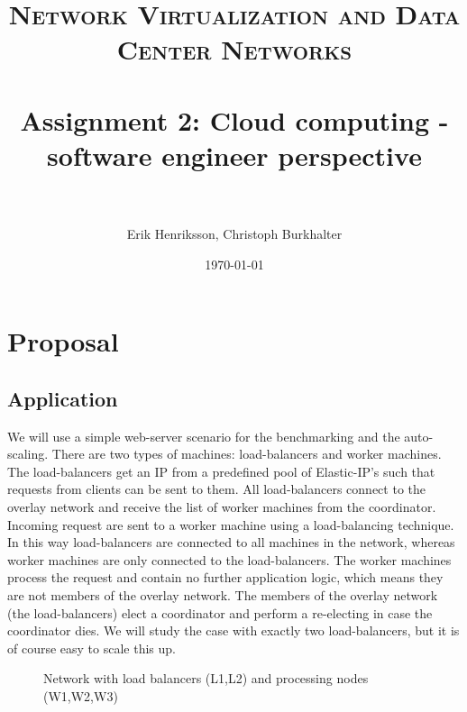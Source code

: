 \documentclass[paper=a4, fontsize=11pt]{scrartcl} %
\title{	
\normalfont \normalsize 
\textsc{Network Virtualization and Data Center Networks} \\ [25pt] %
\horrule{0.5pt} \\[0.4cm] %
\huge Assignment 2: Cloud computing - software engineer perspective\\ %
\horrule{2pt} \\[0.5cm] %
}
\author{Erik Henriksson, Christoph Burkhalter} %
\date{\normalsize\today} %
\numberwithin{equation}{section} %
\numberwithin{figure}{section} %
\numberwithin{table}{section} %
\begin{document}
\maketitle %

\section{Proposal}

\subsection{Application}


We will use a simple web-server scenario for the benchmarking and the auto-scaling. There are two types of machines: load-balancers and worker machines. The load-balancers get an IP from a predefined pool of Elastic-IP's such that requests from clients can be sent to them. All load-balancers connect to the overlay network and receive the list of worker machines from the coordinator. Incoming request are sent to a worker machine using a load-balancing technique. In this way load-balancers are connected to all machines in the network, whereas worker machines are only connected to the load-balancers.
The worker machines process the request and contain no further application logic, which means they are not members of the overlay network.
The members of the overlay network (the load-balancers) elect a coordinator and perform a re-electing in case the coordinator dies. We will study the case with exactly two load-balancers, but it is of course easy to scale this up.


\begin{figure}[h!]
\begin{center}
\end{center}

\caption{Network with load balancers (L1,L2) and processing nodes (W1,W2,W3)}
\end{figure}
\end{document}
